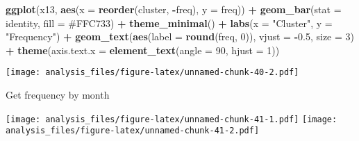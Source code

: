\documentclass[
]{article}
\newenvironment{Shaded}{\begin{snugshade}}{\end{snugshade}}
\newcommand{\AttributeTok}[1]{\textcolor[rgb]{0.13,0.29,0.53}{#1}}
\newcommand{\DecValTok}[1]{\textcolor[rgb]{0.00,0.00,0.81}{#1}}
\newcommand{\FloatTok}[1]{\textcolor[rgb]{0.00,0.00,0.81}{#1}}
\newcommand{\FunctionTok}[1]{\textcolor[rgb]{0.13,0.29,0.53}{\textbf{#1}}}
\newcommand{\NormalTok}[1]{#1}
\newcommand{\SpecialCharTok}[1]{\textcolor[rgb]{0.81,0.36,0.00}{\textbf{#1}}}
\newcommand{\StringTok}[1]{\textcolor[rgb]{0.31,0.60,0.02}{#1}}
\begin{document}
\begin{Shaded}
\begin{Highlighting}[]
\FunctionTok{ggplot}\NormalTok{(x13, }\FunctionTok{aes}\NormalTok{(}\AttributeTok{x =} \FunctionTok{reorder}\NormalTok{(cluster, }\SpecialCharTok{{-}}\NormalTok{freq), }\AttributeTok{y =}\NormalTok{ freq)) }\SpecialCharTok{+} \FunctionTok{geom\_bar}\NormalTok{(}\AttributeTok{stat =} \StringTok{\textquotesingle{}identity\textquotesingle{}}\NormalTok{, }\AttributeTok{fill =} \StringTok{\textquotesingle{}\#FFC733\textquotesingle{}}\NormalTok{) }\SpecialCharTok{+} \FunctionTok{theme\_minimal}\NormalTok{() }\SpecialCharTok{+} \FunctionTok{labs}\NormalTok{(}\AttributeTok{x =} \StringTok{"Cluster"}\NormalTok{, }\AttributeTok{y =} \StringTok{"Frequency"}\NormalTok{) }\SpecialCharTok{+} \FunctionTok{geom\_text}\NormalTok{(}\FunctionTok{aes}\NormalTok{(}\AttributeTok{label =} \FunctionTok{round}\NormalTok{(freq, }\DecValTok{0}\NormalTok{)), }\AttributeTok{vjust =} \SpecialCharTok{{-}}\FloatTok{0.5}\NormalTok{, }\AttributeTok{size =} \DecValTok{3}\NormalTok{) }\SpecialCharTok{+} \FunctionTok{theme}\NormalTok{(}\AttributeTok{axis.text.x =} \FunctionTok{element\_text}\NormalTok{(}\AttributeTok{angle =} \DecValTok{90}\NormalTok{, }\AttributeTok{hjust =} \DecValTok{1}\NormalTok{))}
\end{Highlighting}
\end{Shaded}

\texttt{[image: analysis\_files/figure-latex/unnamed-chunk-40-2.pdf]}

Get frequency by month

\texttt{[image: analysis\_files/figure-latex/unnamed-chunk-41-1.pdf]}
\texttt{[image: analysis\_files/figure-latex/unnamed-chunk-41-2.pdf]}
\end{document}
